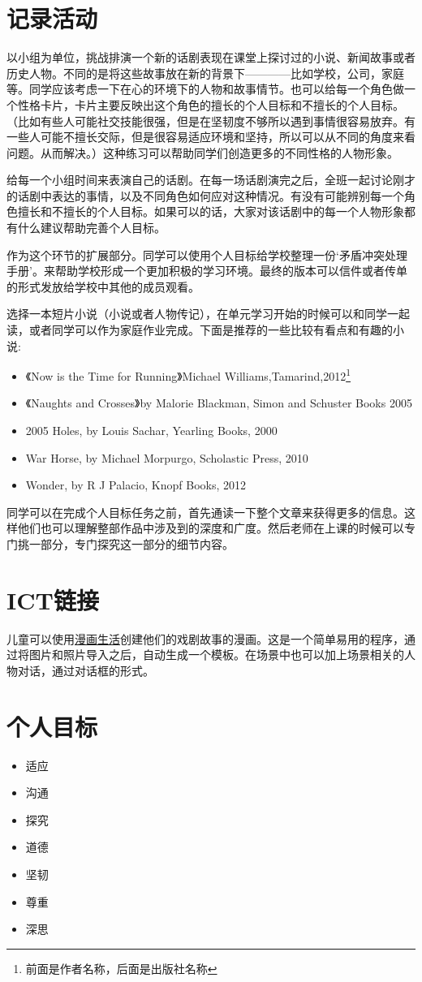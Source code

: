 \section{记录活动}
    以小组为单位，挑战排演一个新的话剧表现在课堂上探讨过的小说、新闻故事或者历史人物。不同的是将这些故事放在新的背景下————比如学校，公司，家庭等。同学应该考虑一下在心的环境下的人物和故事情节。也可以给每一个角色做一个性格卡片，卡片主要反映出这个角色的擅长的个人目标和不擅长的个人目标。（比如有些人可能社交技能很强，但是在坚韧度不够所以遇到事情很容易放弃。有一些人可能不擅长交际，但是很容易适应环境和坚持，所以可以从不同的角度来看问题。从而解决。）这种练习可以帮助同学们创造更多的不同性格的人物形象。\par
    给每一个小组时间来表演自己的话剧。在每一场话剧演完之后，全班一起讨论刚才的话剧中表达的事情，以及不同角色如何应对这种情况。有没有可能辨别每一个角色擅长和不擅长的个人目标。如果可以的话，大家对该话剧中的每一个人物形象都有什么建议帮助完善个人目标。\par
    作为这个环节的扩展部分。同学可以使用个人目标给学校整理一份‘矛盾冲突处理手册’。来帮助学校形成一个更加积极的学习环境。最终的版本可以信件或者传单的形式发放给学校中其他的成员观看。

    选择一本短片小说（小说或者人物传记），在单元学习开始的时候可以和同学一起读，或者同学可以作为家庭作业完成。下面是推荐的一些比较有看点和有趣的小说:\par
    \begin{itemize}
      \item 《Now is the Time for Running》Michael Williams,Tamarind,2012\footnote{前面是作者名称，后面是出版社名称}
      \item  《Naughts and Crosses》by Malorie Blackman, Simon and Schuster Books 2005
      \item  2005 Holes, by Louis Sachar, Yearling Books, 2000
      \item  War Horse, by Michael Morpurgo, Scholastic Press, 2010 
      \item  Wonder, by R J Palacio, Knopf Books, 2012
    \end{itemize}  
    同学可以在完成个人目标任务之前，首先通读一下整个文章来获得更多的信息。这样他们也可以理解整部作品中涉及到的深度和广度。然后老师在上课的时候可以专门挑一部分，专门探究这一部分的细节内容。\par
    
\section{ICT链接}
    儿童可以使用\href{http://plasq.com/products/comiclife/}{漫画生活}创建他们的戏剧故事的漫画。这是一个简单易用的程序，通过将图片和照片导入之后，自动生成一个模板。在场景中也可以加上场景相关的人物对话，通过对话框的形式。


\section{个人目标}
   \begin{itemize}
      \item 适应
      \item 沟通
      \item 探究
      \item 道德
      \item 坚韧
      \item 尊重
      \item 深思 
   \end{itemize}  
